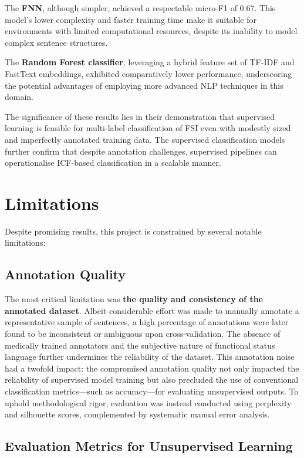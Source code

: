 The \textbf{FNN}, although simpler, achieved a respectable micro-F1 of 0.67. This model's lower complexity and faster training time make it suitable for environments with limited computational resources, despite its inability to model complex sentence structures. 
\medskip

The \textbf{Random Forest classifier}, leveraging a hybrid feature set of TF-IDF and FastText embeddings, exhibited comparatively lower performance, underscoring the potential advantages of employing more advanced NLP techniques in this domain.
\medskip

The significance of these results lies in their demonstration that supervised learning is feasible for multi-label classification of FSI even with modestly sized and imperfectly annotated training data. The supervised classification models further confirm that despite annotation challenges, supervised pipelines can operationalise ICF-based classification in a scalable manner.

\section{Limitations}

Despite promising results, this project is constrained by several notable limitations:

\subsection{Annotation Quality}

The most critical limitation was \textbf{the quality and consistency of the annotated dataset}. Albeit considerable effort was made to manually annotate a representative sample of sentences, a high percentage of annotations were later found to be inconsistent or ambiguous upon cross-validation. The absence of medically trained annotators and the subjective nature of functional status language further undermines the reliability of the dataset. This annotation noise had a twofold impact: the compromised annotation quality not only impacted the reliability of supervised model training but also precluded the use of conventional classification metrics—such as accuracy—for evaluating unsupervised outputs. To uphold methodological rigor, evaluation was instead conducted using perplexity and silhouette scores, complemented by systematic manual error analysis.

\subsection{Evaluation Metrics for Unsupervised Learning}


